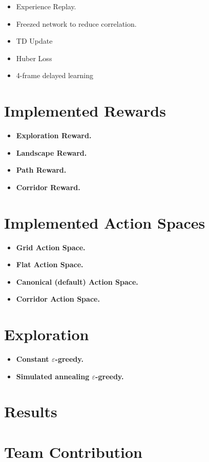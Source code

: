 \documentclass{article}
\begin{document}
\begin{itemize}
        \item Experience Replay.
        \item Freezed network to reduce correlation.
        \item TD Update 
        \item Huber Loss
        \item 4-frame delayed learning
\end{itemize}


\section{Implemented Rewards}

\begin{itemize}
    \item {\bf Exploration Reward.}
    \item {\bf Landscape Reward.}
    \item {\bf Path Reward.}
    \item {\bf Corridor Reward.}
\end{itemize}

\section{Implemented Action Spaces}

\begin{itemize}
    \item {\bf Grid Action Space.}
    \item {\bf Flat Action Space.}
    \item {\bf Canonical (default) Action Space.}
    \item {\bf Corridor Action Space.}
\end{itemize}

\section{Exploration}

\begin{itemize}
    \item {\bf Constant $\varepsilon$-greedy.}
    \item {\bf Simulated annealing $\varepsilon$-greedy.}
\end{itemize}

\section{Results}


\section{Team Contribution}



\end{document}
